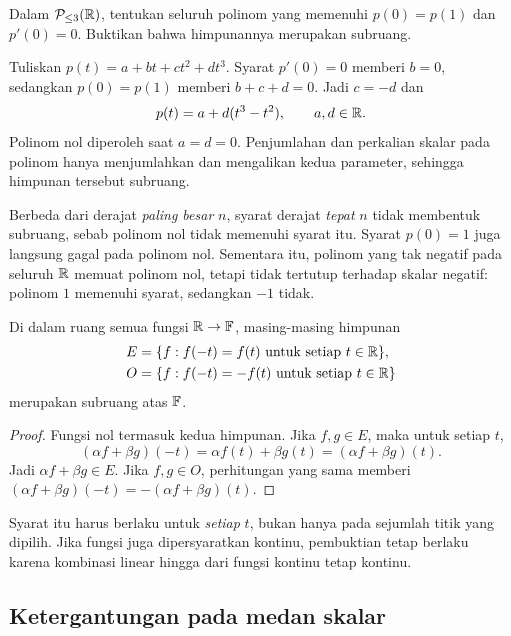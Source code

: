 \begin{exam}
    Dalam $\mathcal P_{\le3}(\mathbb{R})$, tentukan seluruh polinom
    yang memenuhi $p(0)=p(1)$ dan $p'(0)=0$.
    Buktikan bahwa himpunannya merupakan subruang.
\end{exam}
\begin{solution}
    Tuliskan $p(t)=a+bt+ct^2+dt^3$.
    Syarat $p'(0)=0$ memberi $b=0$, sedangkan $p(0)=p(1)$
    memberi $b+c+d=0$. Jadi $c=-d$ dan
    \[
        p(t)=a+d(t^3-t^2),\qquad a,d\in\mathbb{R}.
    \]
    Polinom nol diperoleh saat $a=d=0$.
    Penjumlahan dan perkalian skalar pada polinom hanya menjumlahkan
    dan mengalikan kedua parameter, sehingga himpunan tersebut subruang.
\end{solution}

Berbeda dari derajat \emph{paling besar} $n$, syarat derajat
\emph{tepat} $n$ tidak membentuk subruang, sebab polinom nol
tidak memenuhi syarat itu. Syarat $p(0)=1$ juga langsung gagal
pada polinom nol. Sementara itu, polinom yang tak negatif pada
seluruh $\mathbb{R}$ memuat polinom nol, tetapi tidak tertutup terhadap
skalar negatif: polinom $1$ memenuhi syarat, sedangkan $-1$ tidak.

\begin{prop}
    \label{linear:paritas}
    Di dalam ruang semua fungsi $\mathbb{R}\to\mathbb{F}$, masing-masing himpunan
    \begin{align*}
        E & =\{f:f(-t)=f(t)\text{ untuk setiap }t\in\mathbb{R}\}, \\
        O & =\{f:f(-t)=-f(t)\text{ untuk setiap }t\in\mathbb{R}\}
    \end{align*}
    merupakan subruang atas $\mathbb{F}$.
\end{prop}
\begin{proof}
    Fungsi nol termasuk kedua himpunan. Jika $f,g\in E$,
    maka untuk setiap $t$,
    \[
        (\alpha f+\beta g)(-t)
        =\alpha f(t)+\beta g(t)=(\alpha f+\beta g)(t).
    \]
    Jadi $\alpha f+\beta g\in E$. Jika $f,g\in O$,
    perhitungan yang sama memberi
    $(\alpha f+\beta g)(-t)=-(\alpha f+\beta g)(t)$.
\end{proof}

Syarat itu harus berlaku untuk \emph{setiap} $t$, bukan hanya
pada sejumlah titik yang dipilih. Jika fungsi juga dipersyaratkan
kontinu, pembuktian tetap berlaku karena kombinasi linear hingga
dari fungsi kontinu tetap kontinu.

\subsection{Ketergantungan pada medan skalar}

